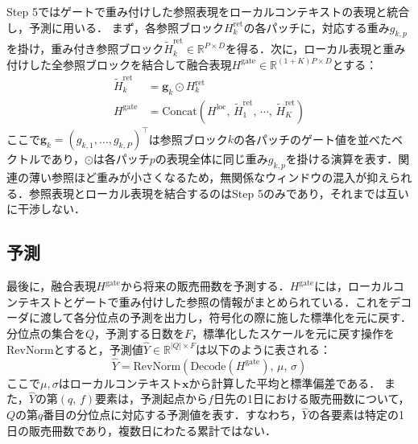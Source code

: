 \documentclass[twocolumn, lastpage]{jarticle}
\newif\ifrevmark
\newcommand{\revA}[1]{\ifrevmark{\color{blue}#1}\else#1\fi}
\begin{document}
Step 5ではゲートで重み付けした参照表現をローカルコンテキストの表現と統合し，予測に用いる．
まず，各参照ブロック$H^{\mathrm{ret}}_k$の各パッチに，対応する重み$g_{k,p}$を掛け，重み付き参照ブロック$\tilde{H}^{\mathrm{ret}}_k \in \mathbb{R}^{P \times D}$を得る．次に，ローカル表現と重み付けした全参照ブロックを結合して融合表現$H^{\mathrm{gate}} \in \mathbb{R}^{(1+K)P \times D}$とする：
  \begin{align}
        \tilde{H}^{\mathrm{ret}}_k &= \bm{g}_k \odot H^{\mathrm{ret}}_k \\
        H^{\mathrm{gate}} &= \mathrm{Concat}(H^{\mathrm{loc}},\,
        \tilde{H}^{\mathrm{ret}}_1,\, \cdots,\,
        \tilde{H}^{\mathrm{ret}}_K)
  \end{align}
ここで$\bm{g}_k = (g_{k,1}, \ldots, g_{k,P})^\top$は参照ブロック$k$の各パッチのゲート値を並べたベクトルであり，$\odot$は各パッチ$p$の表現全体に同じ重み$g_{k,p}$を掛ける演算を表す．関連の薄い参照ほど重みが小さくなるため，無関係なウィンドウの混入が抑えられる．参照表現とローカル表現を結合するのはStep 5のみであり，それまでは互いに干渉しない．


\subsection{予測}
最後に，融合表現$H^{\mathrm{gate}}$から将来の販売冊数を予測する．$H^{\mathrm{gate}}$には，ローカルコンテキストとゲートで重み付けした参照の情報がまとめられている．これをデコーダに渡して各分位点の予測を出力し，符号化の際に施した標準化を元に戻す．分位点の集合を$Q$，予測する日数を$F$，標準化したスケールを元に戻す操作を$\mathrm{RevNorm}$とすると，予測値$\hat{Y} \in \mathbb{R}^{|Q| \times F}$は以下のように表される：
    \begin{equation}
        \hat{Y} = \mathrm{RevNorm}(\mathrm{Decode}(H^{\mathrm{gate}}),\, \mu,\, \sigma)
    \end{equation}
ここで$\mu, \sigma$はローカルコンテキスト$\bm{x}$から計算した平均と標準偏差である．
\revA{また，$\hat{Y}$の第$(q,\, f)$要素は，予測起点から$f$日先の1日における販売冊数について，$Q$の第$q$番目の分位点に対応する予測値を表す．すなわち，$\hat{Y}$の各要素は特定の1日の販売冊数であり，複数日にわたる累計ではない．}
\end{document}
